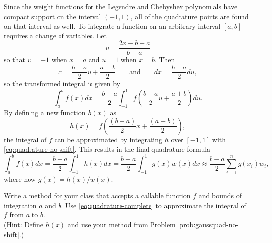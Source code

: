 Since the weight functions for the Legendre and Chebyshev polynomials have compact support on the interval $(-1,1)$, all of the quadrature points are found on that interval as well.
To integrate a function on an arbitrary interval $[a,b]$ requires a change of variables.
Let \[u = \frac{2x - b - a}{b - a}\] so that $u = -1$ when $x = a$ and $u = 1$ when $x=b$.
Then
\[
x = \frac{b - a}{2}u + \frac{a + b}{2}\qquad \text{and}\qquad dx = \frac{b - a}{2}du,
\]
so the transformed integral is given by
\[
\int_a^b f(x) dx = \frac{b-a}{2}\int_{-1}^1 f\left(\frac{b-a}{2}u + \frac{a+b}{2}\right)du.
\]
By defining a new function $h(x)$ as
\[
h(x) = f\left(\frac{(b-a)}{2}x + \frac{(a+b)}{2}\right),
\]
the integral of $f$ can be approximated by integrating $h$ over $[-1,1]$ with \eqref{eq:quadrature-no-shift}.
This results in the final quadrature formula
\begin{equation}
\int_{a}^{b} f(x) dx = \frac{b-a}{2}\int_{-1}^1 h(x)dx = \frac{b-a}{2}\int_{-1}^1 g(x)w(x)dx \approx \frac{b-a}{2}\sum_{i=1}^n g(x_i)w_i,
\label{eq:quadrature-complete}
\end{equation}
where now $g(x) = h(x) / w(x)$.

\begin{problem} %
Write a method for your class that accepts a callable function $f$ and bounds of integration $a$ and $b$.
Use \eqref{eq:quadrature-complete} to approximate the integral of $f$ from $a$ to $b$.
\\(Hint: Define $h(x)$ and use your method from Problem \ref{prob:gaussquad-no-shift}.)
\label{prob:gaussquad-shift}
\end{problem}

\begin{comment}
\section*{Numerical Integration with SciPy} %

There are many other techniques for finding the weights and points for a given weighting function.
SciPy's \li{integrate} module provides some general-purpose integration tools.
For example, \li{scipy.integrate.quad()} is a reasonably fast Gaussian quadrature implementation.
Also included in the \li{integrate} module are fixed-precision and fixed-order Gaussian quadrature methods.
\begin{lstlisting}
>>> from scipy.integrate import quad

>>> f = lambda x: np.cos(x) * np.sin(x)**2 # Function to integrate.
>>> g = lambda x: np.sin(x)**3 / 3         # Antiderivative.

# quad returns an array, the first entry is the computed value.
>>> calc = quad(f, -2, 3)[0]
>>> exact = g(3) - g(-2)                   # Exact value of the integral.
>>> np.<<abs>>(exact - calc)                   # Error of the approximation.
0.0
\end{lstlisting}
\end{comment}


